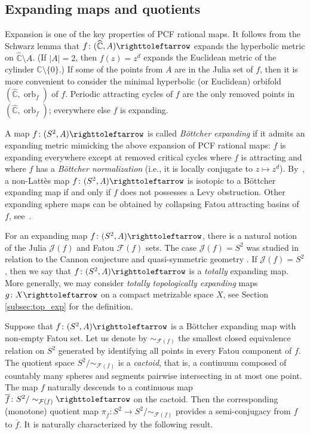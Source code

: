 \documentclass{amsart}
\theoremstyle{plain}
\theoremstyle{definition}
\theoremstyle{remark}
\newcommand{\C}{{\mathbb C}}
\newcommand{\Fat}{{\mathcal F}}
\newcommand{\Jul}{{\mathcal J}}
\newcommand{\orb}{{\operatorname{orb}}}
\newcommand{\wC}{{\widehat \C}}
\newcommand\selfmap{\righttoleftarrow}
\begin{document}
\subsection{Expanding maps and quotients} Expansion is one of the key properties of PCF rational maps. It follows from the Schwarz lemma that $f\colon (\wC,A)\selfmap$ expands the hyperbolic metric on $\wC\setminus A$. (If $|A|=2$, then $f(z)= z^d$ expands the Euclidean metric of the cylinder $\C\setminus \{0\}$.)  If some of the points from $A$ are in the Julia set of $f$, then it is more convenient to consider the minimal hyperbolic (or Euclidean) orbifold $(\wC, \orb_f)$ of $f$. Periodic attracting cycles of $f$ are the only removed points in $(\wC,\orb_f)$; everywhere else $f$ is expanding.

A map $f\colon (S^2,A)\selfmap$ is called \emph{B\"ottcher expanding} if it admits an expanding metric mimicking the above expansion of PCF rational maps: $f$ is expanding everywhere except at removed critical cycles where $f$ is attracting and where $f$ has a \emph{B\"ottcher normalization} (i.e.,  it is locally conjugate to $z\mapsto z^d$). By~\cite{BD_Exp},  a non-Latt\`{e}s map $f\colon (S^2,A)\selfmap$ is isotopic to a B\"ottcher expanding map if and only if $f$ does not possesses a Levy obstruction. Other expanding sphere maps can be obtained by collapsing Fatou attracting basins of $f$, see~\cite[Proposition 1.1]{BD_Exp}. 


For an expanding map $f\colon (S^2,A)\selfmap$, there is a natural notion of the Julia $\Jul(f)$ and Fatou $\Fat(f)$ sets. The case $\Jul(f)=S^2$ was studied in relation to the Cannon conjecture and quasi-symmetric geometry \cite{HP_Expanding, HP_Dimension,THEBook}. If $\Jul(f)=S^2$, then we say that $f\colon(S^2,A)\selfmap$ is a \emph{totally} expanding map.  More generally, we may consider \emph{totally topologically expanding} maps $g\colon X\selfmap $  on a compact metrizable space $X$,  see Section \ref{subsec:top_exp} for the definition. 

 Suppose that $f\colon(S^2,A)\selfmap$ is a B\"ottcher expanding map with non-empty Fatou set.  Let us denote by $\sim_{\Fat(f)}$ the smallest closed equivalence relation on $S^2$ generated by identifying all points in every Fatou component of $f$. The quotient space $S^2/\sim_{\Fat(f)}$ is a \emph{cactoid},  that is, a continuum composed of countably many spheres and segments pairwise intersecting in at most one point. The map $f$ naturally descends to a continuous map $\overline{f}\colon S^2/\sim_{\Fat(f)}\selfmap$ on the cactoid.  Then the corresponding (monotone) quotient map $\pi_{\overline f}\colon S^2 \to S^2/\sim_{\Fat(f)} $ provides a semi-conjugacy from $f$ to $\overline f$. It is naturally characterized by the following result. 
\end{document}

